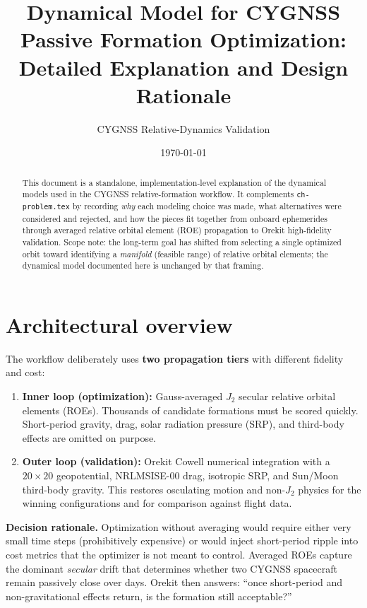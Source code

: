 \documentclass[11pt]{article}
\title{Dynamical Model for CYGNSS Passive Formation Optimization:\\
Detailed Explanation and Design Rationale}
\author{CYGNSS Relative-Dynamics Validation}
\date{\today}
\begin{document}
\maketitle

\begin{abstract}
This document is a standalone, implementation-level explanation of the dynamical models used in the CYGNSS relative-formation workflow. It complements \texttt{ch-problem.tex} by recording \emph{why} each modeling choice was made, what alternatives were considered and rejected, and how the pieces fit together from onboard ephemerides through averaged relative orbital element (ROE) propagation to Orekit high-fidelity validation. Scope note: the long-term goal has shifted from selecting a single optimized orbit toward identifying a \emph{manifold} (feasible range) of relative orbital elements; the dynamical model documented here is unchanged by that framing.
\end{abstract}

\tableofcontents

\section{Architectural overview}

The workflow deliberately uses \textbf{two propagation tiers} with different fidelity and cost:

\begin{enumerate}[label=\textbf{\arabic*.}]
    \item \textbf{Inner loop (optimization):} Gauss-averaged $J_2$ secular relative orbital elements (ROEs). Thousands of candidate formations must be scored quickly. Short-period gravity, drag, solar radiation pressure (SRP), and third-body effects are omitted on purpose.
    \item \textbf{Outer loop (validation):} Orekit Cowell numerical integration with a $20\times20$ geopotential, NRLMSISE-00 drag, isotropic SRP, and Sun/Moon third-body gravity. This restores osculating motion and non-$J_2$ physics for the winning configurations and for comparison against flight data.
\end{enumerate}

\textbf{Decision rationale.} Optimization without averaging would require either very small time steps (prohibitively expensive) or would inject short-period ripple into cost metrics that the optimizer is not meant to control. Averaged ROEs capture the dominant \emph{secular} drift that determines whether two CYGNSS spacecraft remain passively close over days. Orekit then answers: ``once short-period and non-gravitational effects return, is the formation still acceptable?''
\end{document}
